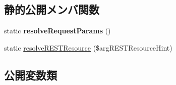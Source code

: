 \subsection*{静的公開メンバ関数}
\begin{DoxyCompactItemize}
\item 
\hypertarget{class_rest_controller_base_a95adbcb37b5e2800c40fbb58c99d5725}{}static {\bfseries resolve\+Request\+Params} ()\label{class_rest_controller_base_a95adbcb37b5e2800c40fbb58c99d5725}

\item 
static \hyperlink{class_rest_controller_base_af58b2d2698c8cca84d6d7c346aaabfba}{resolve\+R\+E\+S\+T\+Resource} (\$arg\+R\+E\+S\+T\+Resource\+Hint)
\end{DoxyCompactItemize}
\subsection*{公開変数類}
